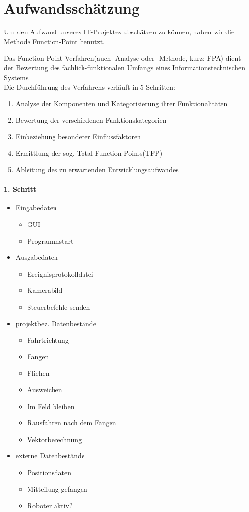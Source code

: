 \section{Aufwandsschätzung}
Um den Aufwand unseres IT-Projektes abschätzen zu können, haben wir die Methode Function-Point benutzt.

Das Function-Point-Verfahren(auch -Analyse oder -Methode, kurz: FPA) dient der Bewertung des fachlich-funktionalen Umfangs eines Informationstechnischen Systems.\\
\newline
Die Durchführung des Verfahrens verläuft in 5 Schritten:
\begin{enumerate}
	\item Analyse der Komponenten und Kategorisierung ihrer Funktionalitäten
	\item Bewertung der verschiedenen Funktionskategorien
	\item Einbeziehung besonderer Einflussfaktoren
	\item Ermittlung der sog. Total Function Points(TFP)
	\item Ableitung des zu erwartenden Entwicklungsaufwandes
\end{enumerate}
\vspace{0.2cm}
\paragraph{1. Schritt}
\begin{itemize}
	\item Eingabedaten
	\begin{itemize}
		\item GUI
		\item Programmstart
	\end{itemize}
	\item Ausgabedaten
	\begin{itemize}
		\item Ereignisprotokolldatei
		\item Kamerabild
		\item Steuerbefehle senden
	\end{itemize}
	\item projektbez. Datenbestände
	\begin{itemize}
		\item Fahrtrichtung
		\item Fangen
		\item Fliehen
		\item Ausweichen
		\item Im Feld bleiben
		\item Rausfahren nach dem Fangen
		\item Vektorberechnung
	\end{itemize}
	\item externe Datenbestände
	\begin{itemize}
		\item Positionsdaten
		\item Mitteilung gefangen
		\item Roboter aktiv?
	\end{itemize}
\end{itemize}

